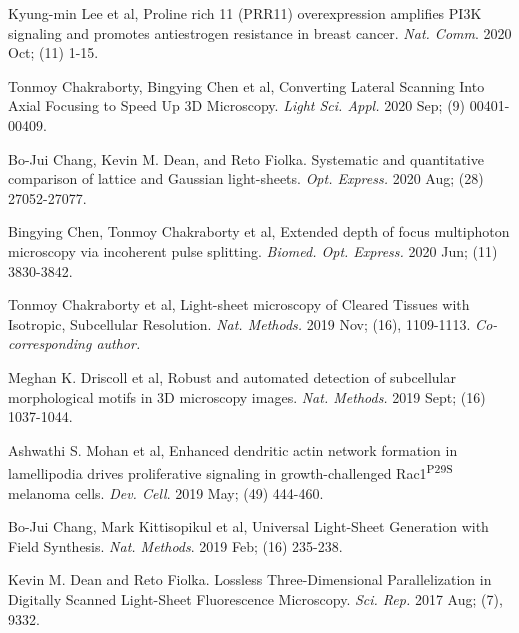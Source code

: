 \begin{etaremune}
\item Kyung-min Lee et al, Proline rich 11 (PRR11) overexpression amplifies PI3K signaling and promotes antiestrogen resistance in breast cancer. {\it Nat. Comm}. 2020 Oct; (11) 1-15.

\item Tonmoy Chakraborty, Bingying Chen et al, Converting Lateral Scanning Into Axial Focusing to Speed Up 3D Microscopy. {\it Light Sci. Appl.} 2020 Sep; (9) 00401-00409.

\item Bo-Jui Chang, Kevin M. Dean, and Reto Fiolka.  Systematic and quantitative comparison of lattice and Gaussian light-sheets.  {\it Opt. Express.} 2020 Aug; (28) 27052-27077.

\item Bingying Chen, Tonmoy Chakraborty et al,  Extended depth of focus multiphoton microscopy via incoherent pulse splitting. {\it Biomed. Opt. Express.} 2020 Jun; (11) 3830-3842.

\item Tonmoy Chakraborty et al, Light-sheet microscopy of Cleared Tissues with Isotropic, Subcellular Resolution. {\it Nat. Methods.} 2019 Nov; (16), 1109-1113.  {\it Co-corresponding author.}

\item Meghan K. Driscoll et al, Robust and automated detection of subcellular morphological motifs in 3D microscopy images. {\it Nat. Methods.} 2019 Sept; (16) 1037-1044.  

\item Ashwathi S. Mohan et al, Enhanced dendritic actin network formation in lamellipodia drives proliferative signaling in growth-challenged Rac1\textsuperscript{P29S} melanoma cells.  
{\it Dev. Cell}.  2019 May; (49) 444-460.

\item Bo-Jui Chang, Mark Kittisopikul et al, Universal Light-Sheet Generation with Field Synthesis. {\it Nat. Methods}. 2019  Feb; (16) 235-238. 

\item Kevin M. Dean and Reto Fiolka.  Lossless Three-Dimensional Parallelization in Digitally Scanned Light-Sheet Fluorescence Microscopy.  {\it Sci. Rep.} 2017 Aug; (7), 9332.  


\end{etaremune}

